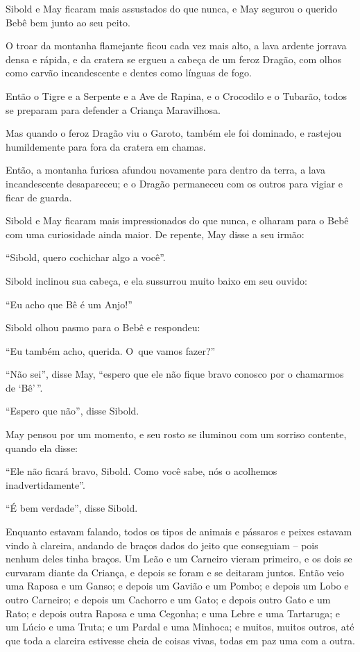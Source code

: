 Sibold e May ficaram mais assustados do que nunca, e May segurou o
querido Bebê bem junto ao seu peito.

O troar da montanha flamejante ficou cada vez mais alto, a lava ardente
jorrava densa e rápida, e da cratera se ergueu a cabeça de um feroz
Dragão, com olhos como carvão incandescente e dentes como línguas de
fogo.

Então o Tigre e a Serpente e a Ave de Rapina, e o Crocodilo e o Tubarão,
todos se preparam para defender a Criança Maravilhosa.

Mas quando o feroz Dragão viu o Garoto, também ele foi dominado, e
rastejou humildemente para fora da cratera em chamas.

Então, a montanha furiosa afundou novamente para dentro da terra, a lava
incandescente desapareceu; e o Dragão permaneceu com os outros para
vigiar e ficar de guarda.

Sibold e May ficaram mais impressionados do que nunca, e olharam para o
Bebê com uma curiosidade ainda maior. De repente, May disse a seu irmão:

``Sibold, quero cochichar algo a você''.

Sibold inclinou sua cabeça, e ela sussurrou muito baixo em seu ouvido:

``Eu acho que Bê é um Anjo!''

Sibold olhou pasmo para o Bebê e respondeu:

``Eu também acho, querida. O~que vamos fazer?''

``Não sei'', disse May, ``espero que ele não fique bravo conosco por o
chamarmos de `Bê'\,''.

``Espero que não'', disse Sibold.

May pensou por um momento, e seu rosto se iluminou com um sorriso
contente, quando ela disse:

``Ele não ficará bravo, Sibold. Como você sabe, nós o acolhemos
inadvertidamente''.

``É bem verdade'', disse Sibold.

Enquanto estavam falando, todos os tipos de animais e pássaros e peixes
estavam vindo à clareira, andando de braços dados do jeito que
conseguiam -- pois nenhum deles tinha braços. Um Leão e um Carneiro
vieram primeiro, e os dois se curvaram diante da Criança, e depois se
foram e se deitaram juntos. Então veio uma Raposa e um Ganso; e depois
um Gavião e um Pombo; e depois um Lobo e outro Carneiro; e depois um
Cachorro e um Gato; e depois outro Gato e um Rato; e depois outra Raposa
e uma Cegonha; e uma Lebre e uma Tartaruga; e um Lúcio e uma Truta; e um
Pardal e uma Minhoca; e muitos, muitos outros, até que toda a clareira
estivesse cheia de coisas vivas, todas em paz uma com a outra.

